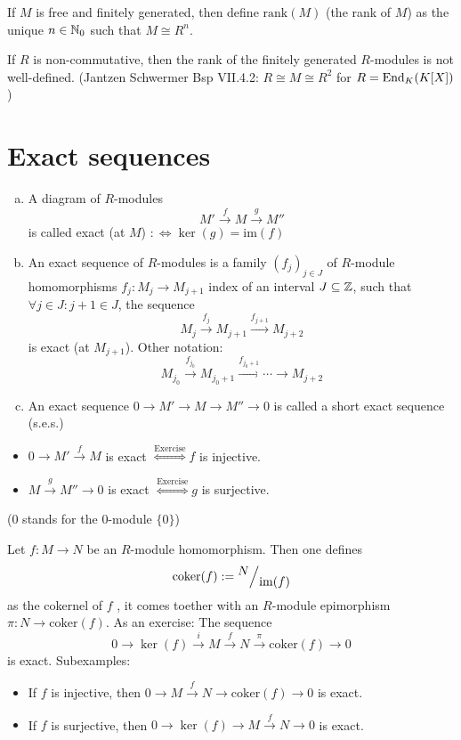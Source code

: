 \documentclass[a4paper]{report}
\begin{document}
\begin{defi}%
If $M$ is free and finitely generated, then define $\mathrm{rank}(M)$ (the rank of $M$) as the unique $n \in \mathbb{N}_0$ such that $M \cong R^{n}$.
\end{defi}

\begin{rem*}
If $R$ is non-commutative, then the rank of the finitely generated $R$-modules is not well-defined. (Jantzen Schwermer Bsp VII.4.2: $R \cong M \cong R^{2}$ for $R = \operatorname{End}_{K}(K[X])$)
\end{rem*}

\section{Exact sequences}
\begin{defi}
\begin{enumerate}[(a)]
  \item A diagram of $R$-modules \[M' \xrightarrow{f} M \xrightarrow{g}M''\]
        is called exact (at $M$) $:\iff \ker(g) = \mathrm{im}(f)$
  \item An exact sequence of $R$-modules is a family $(f_{j})_{j \in J}$ of $R$-module homomorphisms $f_{j}: M_{j} \to M_{j+1}$ index of an interval $J \subseteq \mathbb{Z}$, such that $\forall j \in J : j+1 \in J$, the sequence
        \[M_{j} \xrightarrow{f_{j}} M_{j+1} \xrightarrow{f_{j+1}}M_{j+2}\]
        is exact (at $M_{j+1}$). Other notation: %
        \[M_{j_{0}} \xrightarrow{f_{j_{0}}} M_{j_{0}+1} \xrightarrow{f_{j_{0}+1}} \cdots \to M_{j+2}\]
        \item An exact sequence $0 \to M' \to M \to M'' \to 0$ is called a short exact sequence (s.e.s.)
\end{enumerate}
\end{defi}

\begin{rem*}
  \begin{itemize}
  \item $0 \to M' \xrightarrow{f} M$ is exact $\overset{\text{Exercise}}\iff f$ is injective.
  \item $M \xrightarrow{g} M'' \to 0$ is exact $\overset{\text{Exercise}}\iff g$ is surjective.
  \end{itemize}
  ($0$ stands for the $0$-module $\{0\}$)
\end{rem*}
\begin{exmp}
  Let $f: M \to N$ be an $R$-module homomorphism. Then one defines
  \[\mathrm{coker}(f):= \fak N{\mathrm{im}(f)}\]
 as the cokernel of $f$ , it comes toether with an $R$-module epimorphism $\pi: N \to \mathrm{coker}(f)$. As an exercise: The sequence
  \[0 \to \ker(f) \xrightarrow{i} M \xrightarrow f N \xrightarrow \pi \mathrm{coker}(f) \to 0\]
  is exact. Subexamples:
  \begin{itemize}
    \item If $f$ is injective, then $0 \to M \xrightarrow f N \to \mathrm{coker}(f) \to 0$ is exact.
          \item If $f$ is surjective, then $0 \to \ker(f) \to M \xrightarrow f N \to 0$ is exact.
  \end{itemize}
\end{exmp}
\end{document}
